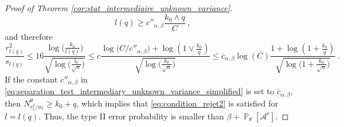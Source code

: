 \documentclass[twoside,11pt]{article}
\def\cA{\mathcal{A}}
\renewcommand{\P}{\operatorname{\mathbb{P}}}
\newcommand{\<}{\langle}
\renewcommand{\>}{\rangle}
\begin{document}
\begin{proof}[Proof of Theorem \ref{cor:stat_intermediaire_unknown_variance}]
\[
 l(q) \geq c''_{\alpha,\beta} \frac{k_0 \wedge q  }{ C}\ ,
\]
and therefore
\[
 \frac{r_{l(q)}^2}{s_{l(q)}}\leq 16 \frac{\log\big(\frac{k_0}{l(q)}\big)}{\sqrt{\log\big(\frac{l_0}{\sqrt{n}}\big)}}\leq c \frac{\log\big(C/c''_{\alpha,\beta}
\big)+ \log(1 \vee \frac{k_0}{q})}{\sqrt{\log\big(\frac{k_0}{\sqrt{n}}\big)}}\leq \overline{c}_{\alpha,\beta} \log( C) \frac{1+ \log(1 + \frac{k_0}{q})}{\sqrt{\log\big(1+\frac{k_0}{\sqrt{n}}\big)}}\ .
\]
If the constant $c''_{\alpha,\beta}$ in \eqref{eq:separation_test_intermediary_unknown_variance_simplified} is set to $\overline{c}_{\alpha,\beta}$,  then $ N_{r_l^2/w_l}^{\theta} \geq k_0+q$, which implies that 
\eqref{eq:condition_rejet2} is satisfied for $l=l(q)$. Thus, the type II error probability is smaller than $\beta+\P_{\theta}[\cA^c]$.
\end{proof}
\end{document}
